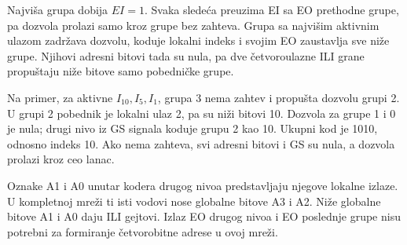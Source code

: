 
Najviša grupa dobija \(EI=1\). Svaka sledeća preuzima EI sa EO prethodne grupe, pa dozvola prolazi samo kroz grupe bez zahteva. Grupa sa najvišim aktivnim ulazom zadržava dozvolu, koduje lokalni indeks i svojim EO zaustavlja sve niže grupe. Njihovi adresni bitovi tada su nula, pa dve četvoroulazne ILI grane propuštaju niže bitove samo pobedničke grupe.

Na primer, za aktivne \(I_{10},I_5,I_1\), grupa 3 nema zahtev i propušta dozvolu grupi 2. U grupi 2 pobednik je lokalni ulaz 2, pa su niži bitovi 10. Dozvola za grupe 1 i 0 je nula; drugi nivo iz GS signala koduje grupu 2 kao 10. Ukupni kod je 1010, odnosno indeks 10. Ako nema zahteva, svi adresni bitovi i GS su nula, a dozvola prolazi kroz ceo lanac.

Oznake A1 i A0 unutar kodera drugog nivoa predstavljaju njegove lokalne izlaze. U kompletnoj mreži ti isti vodovi nose globalne bitove A3 i A2. Niže globalne bitove A1 i A0 daju ILI gejtovi. Izlaz EO drugog nivoa i EO poslednje grupe nisu potrebni za formiranje četvorobitne adrese u ovoj mreži.
